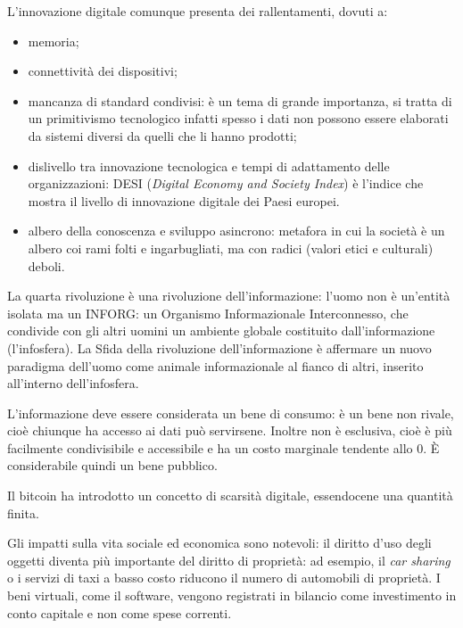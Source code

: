 \documentclass[a4page, 11pt]{article}
\begin{document}
L'innovazione digitale comunque presenta dei rallentamenti, dovuti a:
\begin{itemize}
  \item memoria;
  \item connettività dei dispositivi;
  \item mancanza di standard condivisi: è un tema di grande importanza, si tratta di un primitivismo tecnologico infatti spesso i dati non possono essere elaborati da sistemi diversi da quelli che li hanno prodotti;
  \item dislivello tra innovazione tecnologica e tempi di adattamento delle organizzazioni: DESI (\textit{Digital Economy and Society Index}) è l'indice che mostra il livello di innovazione digitale dei Paesi europei.
  \item albero della conoscenza e sviluppo asincrono: metafora in cui la società è un albero coi rami folti e ingarbugliati, ma con radici (valori etici e culturali) deboli.
\end{itemize}

La quarta rivoluzione è una rivoluzione dell'informazione: l'uomo non è un'entità isolata ma un INFORG: un Organismo Informazionale Interconnesso, che condivide con gli altri uomini un ambiente globale costituito dall'informazione (l'infosfera).
La Sfida della rivoluzione dell'informazione è affermare un nuovo paradigma dell'uomo come animale informazionale al fianco di altri, inserito all'interno dell'infosfera.

L'informazione deve essere considerata un bene di consumo: è un bene non rivale, cioè chiunque ha accesso ai dati può servirsene.
Inoltre non è esclusiva, cioè è più facilmente condivisibile e accessibile e ha un costo marginale tendente allo $0$.
È considerabile quindi un bene pubblico. \newline

Il bitcoin ha introdotto un concetto di scarsità digitale, essendocene una quantità finita.

Gli impatti sulla vita sociale ed economica sono notevoli: il diritto d'uso degli oggetti diventa più importante del diritto di proprietà: ad esempio, il \textit{car sharing} o i servizi di taxi a basso costo riducono il numero di automobili di proprietà.
I beni virtuali, come il software, vengono registrati in bilancio come investimento in conto capitale e non come spese correnti.
\end{document}

